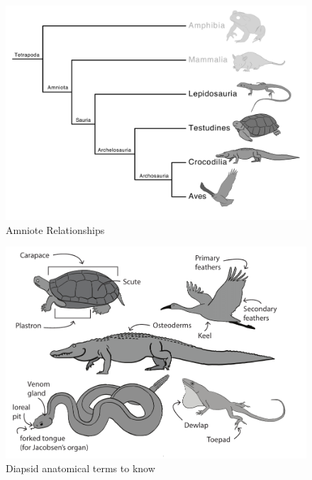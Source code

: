 \documentclass[a4paper,12pt]{article}
\begin{document}
%
%

\pagestyle{fancyplain}
\fancyhf{}
\thispagestyle{plain}

\begin{figure}[H]
\centering
  \includegraphics[scale=0.4]{Amniota_tre.pdf}
  \caption{Amniote Relationships}
  \label{fig:Amniota}
\end{figure}

\begin{figure}[H]
\centering
  \includegraphics{DiapsidAnatomy.pdf}
  \caption{Diapsid anatomical terms to know}
  \label{fig:Anura}
\end{figure}
\end{document}
